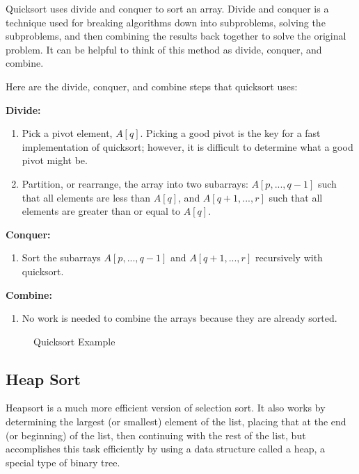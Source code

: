 \documentclass[twoside,12pt,a4paper,english]{book}
\theoremstyle{definition}
\theoremstyle{problemstyle}
\begin{document}
Quicksort uses divide and conquer to sort an array. Divide and conquer is a technique used for breaking algorithms down into subproblems, solving the subproblems, and then combining the results back together to solve the original problem. It can be helpful to think of this method as divide, conquer, and combine.

Here are the divide, conquer, and combine steps that quicksort uses:

\textbf{Divide:}

\begin{enumerate}
\item Pick a pivot element, \texttt{$A[q]$}. Picking a good pivot is the key for a fast implementation of quicksort; however, it is difficult to determine what a good pivot might be.
\item Partition, or rearrange, the array into two subarrays: \texttt{$A[p,...,q-1]$} such that all elements are less than \texttt{$A[q]$}, and \texttt{$A[q+1,...,r]$} such that all elements are greater than or equal to \texttt{$A[q]$}.
\end{enumerate}
\newpage

\textbf{Conquer:}

\begin{enumerate}
\item Sort the subarrays \texttt{$A[p,...,q-1]$} and \texttt{$A[q+1,...,r]$} recursively with quicksort.
\end{enumerate}

\textbf{Combine:}

\begin{enumerate}
\item No work is needed to combine the arrays because they are already sorted.
\end{enumerate}

\begin{figure}[htbp]
  \centering
  

  Quicksort Example
\end{figure}
\newpage

\subsection{Heap Sort}

Heapsort is a much more efficient version of selection sort. It also works by determining the largest (or smallest) element of the list, placing that at the end (or beginning) of the list, then continuing with the rest of the list, but accomplishes this task efficiently by using a data structure called a heap, a special type of binary tree.
\end{document}
